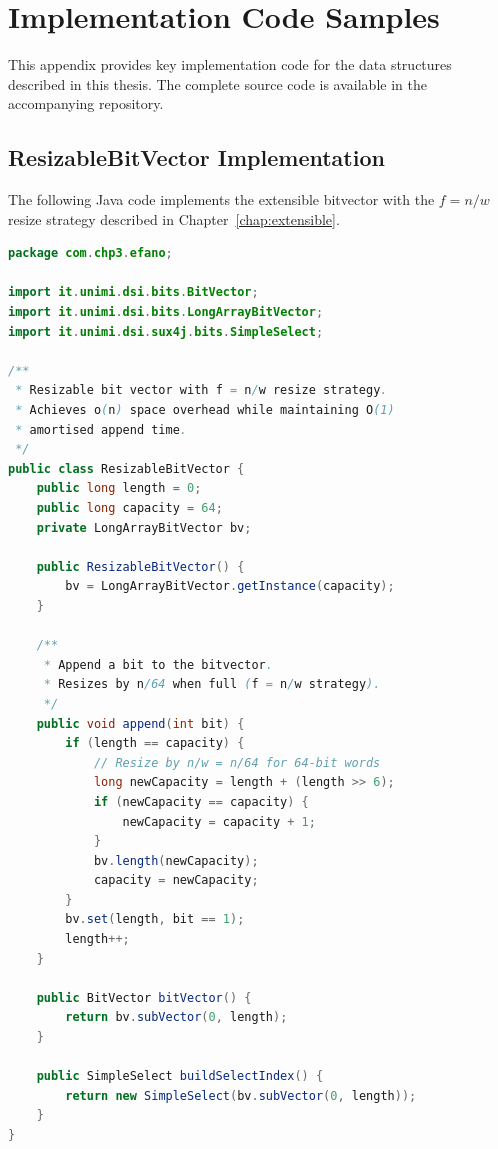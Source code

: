 \chapter{Implementation Code Samples}
\label{appendix:code}

This appendix provides key implementation code for the data structures described in this thesis. The complete source code is available in the accompanying repository.

\section{ResizableBitVector Implementation}
\label{sec:rbv-code}

The following Java code implements the extensible bitvector with the $f = n/w$ resize strategy described in Chapter~\ref{chap:extensible}.

\begin{lstlisting}[language=Java, caption={ResizableBitVector.java - Core implementation}, label={lst:rbv}]
package com.chp3.efano;

import it.unimi.dsi.bits.BitVector;
import it.unimi.dsi.bits.LongArrayBitVector;
import it.unimi.dsi.sux4j.bits.SimpleSelect;

/**
 * Resizable bit vector with f = n/w resize strategy.
 * Achieves o(n) space overhead while maintaining O(1)
 * amortised append time.
 */
public class ResizableBitVector {
    public long length = 0;
    public long capacity = 64;
    private LongArrayBitVector bv;

    public ResizableBitVector() {
        bv = LongArrayBitVector.getInstance(capacity);
    }

    /**
     * Append a bit to the bitvector.
     * Resizes by n/64 when full (f = n/w strategy).
     */
    public void append(int bit) {
        if (length == capacity) {
            // Resize by n/w = n/64 for 64-bit words
            long newCapacity = length + (length >> 6);
            if (newCapacity == capacity) {
                newCapacity = capacity + 1;
            }
            bv.length(newCapacity);
            capacity = newCapacity;
        }
        bv.set(length, bit == 1);
        length++;
    }

    public BitVector bitVector() {
        return bv.subVector(0, length);
    }

    public SimpleSelect buildSelectIndex() {
        return new SimpleSelect(bv.subVector(0, length));
    }
}
\end{lstlisting}

